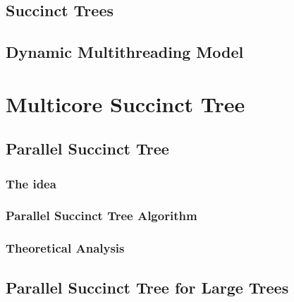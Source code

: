 \documentclass{sig-alternate}
\begin{document}
\subsection{Succinct Trees}
\label{subsec:suctrees}


\subsection{Dynamic Multithreading Model}
\label{subsec:dym}


%


\section{Multicore Succinct Tree}
\label{sec:multicoreST}


\subsection{Parallel Succinct Tree}
\label{sec:PST}

\subsubsection{The idea}
\label{subsec:idea}


\subsubsection{Parallel Succinct Tree Algorithm}
\label{subsec:multicoreSTAlgorithm}


\subsubsection{Theoretical Analysis}
\label{subsec:theoreticalAnalysis}


\subsection{Parallel Succinct Tree for Large Trees}
\label{subsec:parallelLargeTrees}

\end{document}
